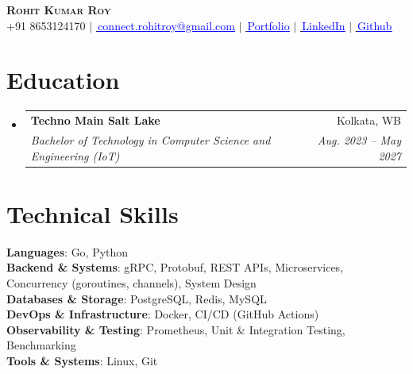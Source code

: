 \documentclass[letterpaper,11pt]{article}
\makeatletter
\newcommand{\resumeSubheading}[4]{
  \vspace{-2pt}\item
    \begin{tabular*}{0.97\textwidth}[t]{l@{\extracolsep{\fill}}r}
      \textbf{#1} & #2 \\
      \textit{\small#3} & \textit{\small #4} \\
    \end{tabular*}\vspace{-7pt}
}
\newcommand{\resumeSubHeadingListStart}{\begin{itemize}[leftmargin=0.15in, label={}]}
\newcommand{\resumeSubHeadingListEnd}{\end{itemize}}
\makeatother
\begin{document}

\begin{center}
    \textbf{\Huge \scshape Rohit Kumar Roy} \\ \vspace{1pt}
    \small {\footnotesize\faPhone} +91 8653124170 $|$ \href{mailto:connect.rohitroy@gmail.com}{\footnotesize\faEnvelope\,\textcolor{blue}{\underline{connect.rohitroy@gmail.com}}} $|$ 
    \href{https://rohit-roy-portfolio.vercel.app/}{\footnotesize\faGlobe\,\textcolor{blue}{\underline{Portfolio}}} $|$
    \href{https://www.linkedin.com/in/rohit-roy-vs/}{\footnotesize\faLinkedin\,\textcolor{blue}{\underline{LinkedIn}}} $|$ 
    \href{https://github.com/kayden-vs}{\footnotesize\faGithub\,\textcolor{blue}{\underline{Github}}}
\end{center}
\vspace{1mm}


\section{Education}
  \resumeSubHeadingListStart
    \resumeSubheading
      {Techno Main Salt Lake}{Kolkata, WB}
      {Bachelor of Technology in Computer Science and Engineering (IoT)}
      {Aug. 2023 -- May 2027}
  \resumeSubHeadingListEnd
  \vspace{1mm}

\section{Technical Skills}
 \begin{itemize}[leftmargin=0.15in, label={}]
    \small{\item{
     \textbf{Languages}{: Go, Python} \\
     \textbf{Backend \& Systems}{: gRPC, Protobuf, REST APIs, Microservices, Concurrency (goroutines, channels), System Design} \\
     \textbf{Databases \& Storage}{: PostgreSQL, Redis, MySQL} \\
     \textbf{DevOps \& Infrastructure}{: Docker, CI/CD (GitHub Actions)} \\
     \textbf{Observability \& Testing}{: Prometheus, Unit \& Integration Testing, Benchmarking} \\
     \textbf{Tools \& Systems}{: Linux, Git}
    }}
 \end{itemize}
 \vspace{1mm}
\end{document}
